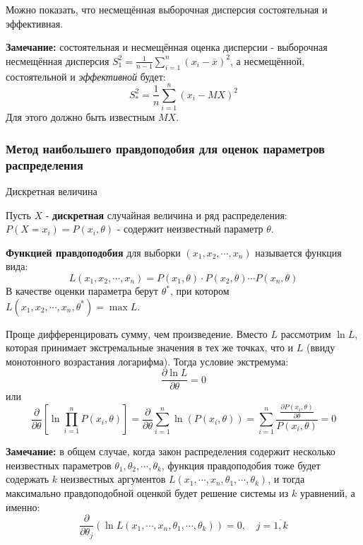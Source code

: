 \documentclass[12pt, a4paper]{article}
\begin{document}
Можно показать, что несмещённая выборочная дисперсия состоятельная и эффективная.

\textbf{Замечание:} состоятельная и несмещённая оценка дисперсии - выборочная несмещённая дисперсия $S_1^2 = \frac{1}{n-1} \sum_{i=1}^n (x_i - \overline{x})^2$, а несмещённой, состоятельной и \textit{эффективной} будет:
\[S^2_{*} = \frac{1}{n} \sum_{i=1}^n (x_i - MX)^2 \]
Для этого должно быть известным $MX$.

\subsubsection{Метод наибольшего правдоподобия для оценок параметров распределения}

\begin{center}
\begin{Large}
Дискретная величина
\end{Large}
\end{center}

Пусть $X$ - \textbf{дискретная} случайная величина и ряд распределения: $P(X=x_i) = P(x_i, \theta)$ - содержит неизвестный параметр $\theta$.

\textbf{Функцией правдоподобия} для выборки $(x_1, x_2, \cdots, x_n)$ называется функция вида:
\[L(x_1, x_2, \cdots, x_n) = P(x_1, \theta) \cdot P(x_2, \theta) \cdots P(x_n, \theta) \]
В качестве оценки параметра берут $\theta^*$, при котором $L(x_1, x_2, \cdots, x_n, \theta^*) = \max L$.

Проще дифференцировать сумму, чем произведение. Вместо $L$ рассмотрим $\ln L$, которая принимает экстремальные значения в тех же точках, что и $L$ (ввиду монотонного возрастания логарифма). Тогда условие экстремума:
\[\frac{\partial \ln L}{\partial \theta} = 0 \]
или
\[\frac{\partial}{\partial \theta} [\ln \prod_{i=1}^n P(x_i, \theta)] = \frac{\partial}{\partial \theta} \sum_{i=1}^n \ln (P(x_i, \theta)) = \sum_{i=1}^n \frac{\frac{\partial P(x_i, \theta)}{\partial \theta}}{P(x_i, \theta)} = 0 \]

\textbf{Замечание:} в общем случае, когда закон распределения содержит несколько неизвестных параметров $\theta_1, \theta_2, \cdots, \theta_k$, функция правдоподобия тоже будет содержать $k$ неизвестных аргументов $L(x_1, \cdots, x_n, \theta_1, \cdots, \theta_k)$, и тогда максимально правдоподобной оценкой будет решение системы из $k$ уравнений, а именно:
\[\frac{\partial}{\partial \theta_j} (\ln L(x_1, \cdots, x_n, \theta_1, \cdots, \theta_k)) = 0, \quad j=\overline{1, k} \]
\end{document}

